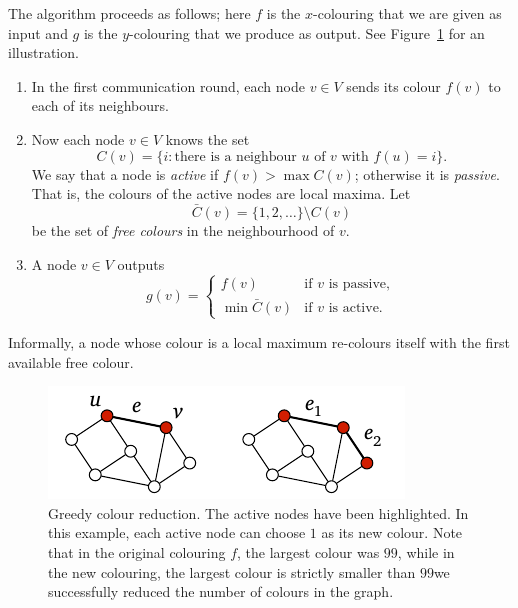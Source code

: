 The algorithm proceeds as follows; here $f$ is the $x$-colouring that we are given as input and $g$ is the $y$-colouring that we produce as output. See Figure~\ref{fig:greedy} for an illustration.
\begin{enumerate}
    \item In the first communication round, each node $v \in V$ sends its colour $f(v)$ to each of its neighbours.
    \item Now each node $v \in V$ knows the set
    \[
        C(v) = \{ i : \text{there is a neighbour $u$ of $v$ with $f(u) = i$} \}.
    \]
    We say that a node is \emph{active} if $f(v) > \max C(v)$; otherwise it is \emph{passive}. That is, the colours of the active nodes are local maxima. Let
    \[
        \bar{C}(v) = \{1,2,\dotsc\} \setminus C(v)
    \]
    be the set of \emph{free colours} in the neighbourhood of $v$.
    \item A node $v \in V$ outputs
    \[
        g(v) = \begin{cases}
            f(v) & \text{if $v$ is passive}, \\
            \min \bar{C}(v) & \text{if $v$ is active}.
        \end{cases}
    \]
\end{enumerate}
Informally, a node whose colour is a local maximum re-colours itself with the first available free colour.

\begin{figure}
    \centering
    \includegraphics[page=\PGreedy]{figs.pdf}
    \caption{Greedy colour reduction. The active nodes have been highlighted. In this example, each active node can choose $1$ as its new colour. Note that in the original colouring $f$, the largest colour was $99$, while in the new colouring, the largest colour is strictly smaller than $99$\mydash we successfully reduced the number of colours in the graph.}\label{fig:greedy}
\end{figure}

